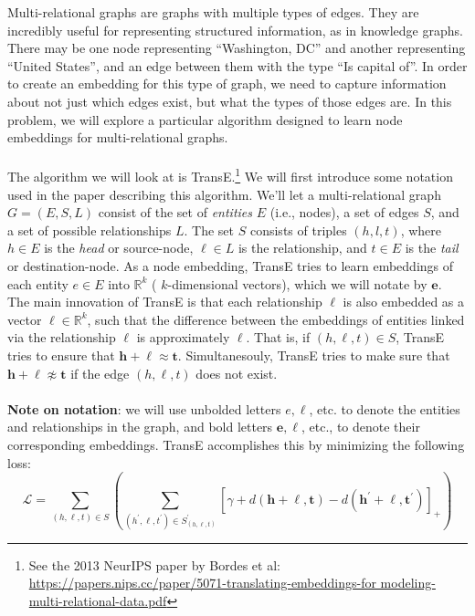 \documentclass[11pt]{article}
\numberwithin{figure}{section}
\begin{document}
\noindent Multi-relational graphs are graphs with multiple types of edges. They are incredibly useful for representing structured information, as in knowledge graphs. There may be one node representing “Washington, DC” and another representing “United States”, and an edge between them with the type “Is capital of”. In order to create an embedding for this type of graph, we need to capture information about not just which edges exist, but what the types of those edges are. In this problem, we will explore a particular algorithm designed to learn node embeddings for multi-relational graphs. \\\\
The algorithm we will look at is TransE.\footnote{See the 2013 NeurIPS paper by Bordes et al: \url{https://papers.nips.cc/paper/5071-translating-embeddings-for modeling-multi-relational-data.pdf}}
We will first introduce some notation used in the paper describing this algorithm.
We’ll let a multi-relational graph $G = (E, S, L)$ consist of the set of \textit{entities} $E$ (i.e., nodes), a set of edges $S$, and a set of possible relationships $L$.
The set $S$ consists of triples $(h, l, t)$, where $h \in E$ is the \textit{head} or source-node, $\ell \in L$ is the relationship, and $t \in E$ is the \textit{tail} or destination-node.
As a node embedding, TransE tries to learn embeddings of each entity $e \in E$ into $\mathbb{R}^k$ ( $k$-dimensional vectors), which we will notate by $\mathbf{e}$. The main innovation of TransE is that each relationship $\ell$ is also embedded as a vector $\ell \in \mathbb{R}^k$, such that the difference between the embeddings of entities linked via the relationship $\ell$ is approximately $\ell$. That is, if $(h, \ell, t) \in S$, TransE tries to ensure that $\mathbf{h}+\boldsymbol{\ell} \approx \mathbf{t}$. Simultanesouly, TransE tries to make sure that $\mathbf{h}+\boldsymbol{\ell} \not\approx \mathbf{t}$ if the edge $(h, \ell, t)$ does not exist.\\\\
\textbf{Note on notation}: we will use unbolded letters $e, \ell$, etc. to denote the entities and relationships in the graph, and bold letters $\mathbf{e}, \boldsymbol{\ell}$, etc., to denote their corresponding embeddings.
TransE accomplishes this by minimizing the following loss:
\begin{equation}\label{eq1}
\mathcal{L}=\sum_{(h, \ell, t) \in S}\left(\sum_{\left(h^{\prime}, \ell, t^{\prime}\right) \in S_{(h, \ell, t)}^{\prime}}\left[\gamma+d(\mathbf{h}+\boldsymbol{\ell}, \mathbf{t})-d\left(\mathbf{h}^{\prime}+\boldsymbol{\ell}, \mathbf{t}^{\prime}\right)\right]_{+}\right)
\end{equation}
\end{document}
